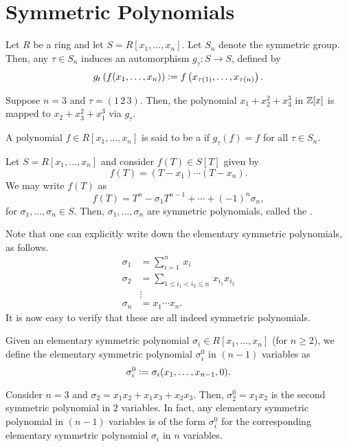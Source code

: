 \section{Symmetric Polynomials}

\begin{defn}
    Let $R$ be a ring and let $S = R[x_1, \ldots, x_n]$. Let $S_n$ denote the symmetric group. Then, any $\tau \in S_n$ induces an automorphism $g_{\tau} \colon S \to S$, defined by
    \[
        g_t\left( f(x_1, \ldots, x_n) \right) \vcentcolon= f\left( x_{\tau(1)}, \ldots, x_{\tau(n)} \right).
    \]
\end{defn}
\begin{ex}
    Suppose $n = 3$ and $\tau = (1 \, 2 \, 3)$. Then, the polynomial $x_1 + x_2^2 + x_3^3$ in $\mathbb{Z}[x]$ is mapped to $x_2 + x_3^2 + x_1^3$ via $g_{\tau}$.
\end{ex}
\begin{defn}
    A polynomial $f \in R[x_1, \ldots, x_n]$ is said to be a  if $g_{\tau}(f) = f$ for all $\tau \in S_n$.
\end{defn}

\begin{defn}
    Let $S = R[x_1, \ldots, x_n]$ and consider $f(T) \in S[T]$ given by
    \[
        f(T) = (T-x_1) \cdots (T-x_n).
    \]
    We may write $f(T)$ as
    \[
        f(T) = T^n - \sigma_1 T^{n-1} + \cdots + (-1)^n \sigma_n,
    \]
    for $\sigma_1, \ldots, \sigma_n \in S$. Then, $\sigma_1, \ldots, \sigma_n$ are symmetric polynomials, called the .
\end{defn}
\begin{rem}
    Note that one can explicitly write down the elementary symmetric polynomials, as follows. 
    \begin{align*}
        \sigma_1 &= \sum_{i=1}^n \, x_i \\
        \sigma_2 &= \sum_{1 \leq i_1 < i_2 \leq n} \, x_{i_1} x_{i_2} \\
        &\vdots \\
        \sigma_n &= x_1 \cdots x_n.
    \end{align*}
    It is now easy to verify that these are all indeed symmetric polynomials.
\end{rem}

\begin{defn}
    Given an elementary symmetric polynomial $\sigma_i \in R[x_1, \ldots, x_n]$ (for $n \geq 2$), we define the elementary symmetric polynomial $\sigma_i^0$ in $(n-1)$ variables as
    \[
        \sigma_i^0 \vcentcolon= \sigma_i(x_1, \ldots, x_{n-1}, 0).
    \]
\end{defn}
\begin{ex}
    Consider $n = 3$ and $\sigma_2 = x_1x_2 + x_1x_3 + x_2x_3$. Then, $\sigma_2^0 = x_1x_2$ is the second symmetric polynomial in $2$ variables. In fact, any elementary symmetric polynomial in $(n-1)$ variables is of the form $\sigma_i^0$ for the corresponding elementary symmetric polynomial $\sigma_i$ in $n$ variables.
\end{ex}


